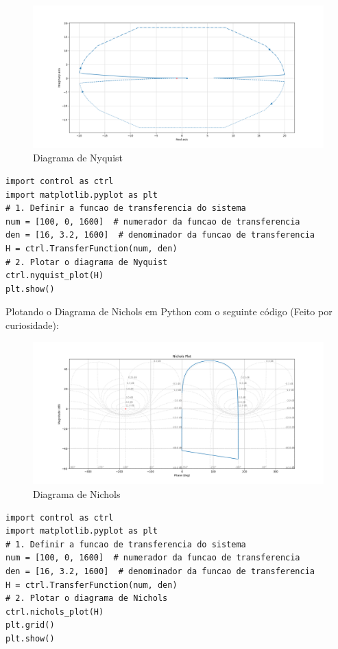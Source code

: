 \documentclass[10pt]{article}
\begin{document}
\begin{figure}[h]
    \centering
    \includegraphics[scale=0.45]{nyquist.png}
    \caption{Diagrama de Nyquist}
\end{figure}

\begin{lstlisting}
import control as ctrl
import matplotlib.pyplot as plt
# 1. Definir a funcao de transferencia do sistema
num = [100, 0, 1600]  # numerador da funcao de transferencia
den = [16, 3.2, 1600]  # denominador da funcao de transferencia
H = ctrl.TransferFunction(num, den)
# 2. Plotar o diagrama de Nyquist
ctrl.nyquist_plot(H)
plt.show()
\end{lstlisting}

\newpage

\quad Plotando o Diagrama de Nichols em Python com o seguinte código (Feito por curiosidade):

\begin{figure}[h]
    \centering
    \includegraphics[scale=0.45]{nichols.png}
    \caption{Diagrama de Nichols}
\end{figure}

\begin{lstlisting}
import control as ctrl
import matplotlib.pyplot as plt
# 1. Definir a funcao de transferencia do sistema
num = [100, 0, 1600]  # numerador da funcao de transferencia
den = [16, 3.2, 1600]  # denominador da funcao de transferencia
H = ctrl.TransferFunction(num, den)
# 2. Plotar o diagrama de Nichols
ctrl.nichols_plot(H)
plt.grid()
plt.show()
\end{lstlisting}
\end{document}
